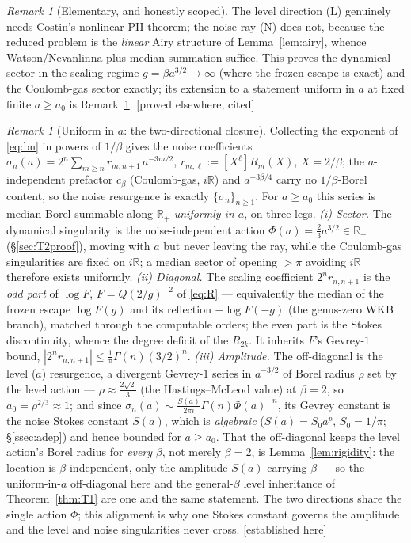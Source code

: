 \documentclass[11pt,reqno]{amsart}
\theoremstyle{plain}
\theoremstyle{definition}
\theoremstyle{remark}
\newtheorem{remark}[theorem]{Remark}
\newcommand{\R}{\mathbb{R}}
\newcommand{\tagPr}{{\footnotesize\textsf{[established here]}}}
\newcommand{\tagP}{{\footnotesize\textsf{[proved elsewhere, cited]}}}
\begin{document}
\begin{remark}[Elementary, and honestly scoped]\label{rem:elem}
The level direction (L) genuinely needs Costin's nonlinear PII theorem; the noise ray (N) does not,
because the reduced problem is the \emph{linear} Airy structure of Lemma~\ref{lem:airy}, whence
Watson/Nevanlinna \cite{Sokal} plus median summation suffice. This proves the dynamical sector in the
scaling regime $g=\beta a^{3/2}\to\infty$ (where the frozen escape is exact) and the Coulomb-gas
sector exactly; its extension to a statement uniform in $a$ at fixed finite $a\ge a_0$ is
Remark~\ref{rem:uniform}. \tagP
\end{remark}

\begin{remark}[Uniform in $a$: the two-directional closure]\label{rem:uniform}
Collecting the exponent of \eqref{eq:bn} in powers of $1/\beta$ gives the noise coefficients
$\sigma_n(a)=2^n\sum_{m\ge n}r_{m,n+1}\,a^{-3m/2}$, $r_{m,\ell}:=[X^\ell]R_m(X)$, $X=2/\beta$; the
$a$-independent prefactor $c_\beta$ (Coulomb-gas, $i\R$) and $a^{-3\beta/4}$ carry no $1/\beta$-Borel
content, so the noise resurgence is exactly $\{\sigma_n\}_{n\ge1}$. For $a\ge a_0$ this series is median
Borel summable along $\R_+$ \emph{uniformly in $a$}, on three legs. \emph{(i) Sector.} The dynamical
singularity is the noise-independent action $\Phi(a)=\tfrac23a^{3/2}\in\R_+$ (\S\ref{sec:T2proof}),
moving with $a$ but never leaving the ray, while the Coulomb-gas singularities are fixed on $i\R$; a
median sector of opening $>\pi$ avoiding $i\R$ therefore exists uniformly. \emph{(ii) Diagonal.} The
scaling coefficient $2^n r_{n,n+1}$ is the \emph{odd part} of $\log F$, $F=\tilde Q(2/g)^{-2}$ of
\eqref{eq:R} --- equivalently the median of the frozen escape $\log F(g)$ and its reflection
$-\log F(-g)$ (the genus-zero WKB branch), matched through the computable orders; the even part is the
Stokes discontinuity, whence the degree deficit of the $R_{2k}$. It inherits $F$'s Gevrey-$1$ bound,
$|2^n r_{n,n+1}|\le\tfrac1\pi\Gamma(n)(3/2)^n$. \emph{(iii) Amplitude.} The off-diagonal is the level
($a$) resurgence, a divergent Gevrey-$1$ series in $a^{-3/2}$ of Borel radius $\rho$ set by the level
action --- $\rho\approx\tfrac{2\sqrt2}3$ (the Hastings--McLeod value) at $\beta{=}2$, so
$a_0=\rho^{2/3}\approx1$; and since $\sigma_n(a)\sim\tfrac{S(a)}{2\pi i}\Gamma(n)\Phi(a)^{-n}$, its
Gevrey constant is the noise Stokes constant $S(a)$, which is \emph{algebraic} ($S(a)=S_0a^p$,
$S_0=1/\pi$; \S\ref{ssec:adep}) and hence bounded for $a\ge a_0$. That the off-diagonal keeps the
level action's Borel radius for \emph{every} $\beta$, not merely $\beta=2$, is Lemma~\ref{lem:rigidity}:
the location is $\beta$-independent, only the amplitude $S(a)$ carrying $\beta$ --- so the
uniform-in-$a$ off-diagonal here and the general-$\beta$ level inheritance of Theorem~\ref{thm:T1} are
one and the same statement. The two directions share the single
action $\Phi$; this alignment is why one Stokes constant governs the amplitude and the level and noise
singularities never cross. \tagPr
\end{remark}
\end{document}
